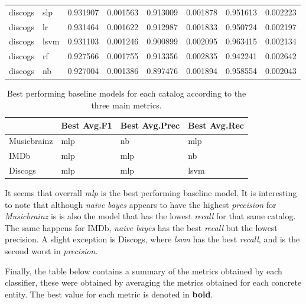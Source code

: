 \documentclass[epsfig,a4paper,11pt,titlepage,twoside,openany]{book}
\begin{document}
\begin{longtable}{|l|l|l|l|l|l|l|l|}
discogs     & slp   & 0.931907 & 0.001563   & 0.913009 & 0.001878     & 0.951613 & 0.002223    \\
discogs     & lr    & 0.931464 & 0.001622   & 0.912987 & 0.001833     & 0.950724 & 0.002197    \\
discogs     & lsvm  & 0.931103 & 0.001246   & 0.900899 & 0.002095     & 0.963415 & 0.002134    \\
discogs     & rf    & 0.927566 & 0.001755   & 0.913356 & 0.002835     & 0.942241 & 0.002642    \\
discogs     & nb    & 0.927004 & 0.001386   & 0.897476 & 0.001894     & 0.958554 & 0.002043    \\ \hline
\end{longtable}



\begin{table}[H]
\centering
\begin{tabular}{l|l|l|l}
                                  & Best Avg.F1 & Best Avg.Prec & Best Avg.Rec \\ \hline
\multicolumn{1}{l|}{Musicbrainz} & mlp    & nb       & mlp     \\ \hline
\multicolumn{1}{l|}{IMDb}        & mlp    & mlp      & nb      \\ \hline
\multicolumn{1}{l|}{Discogs}     & mlp    & mlp      & lsvm    \\ 
\end{tabular}
\caption{Best performing baseline models for each catalog according to the three main metrics.}
\label{tab:best-model-per-metric-average}
\end{table}

It seems that overrall \textit{mlp} is the best performing baseline model. It is interesting to note that although \textit{naive bayes} appears to have the highest \textit{precision} for \textit{Musicbrainz} is is also the model that has the lowest \textit{recall} for that same catalog. The same happens for IMDb, \textit{naive bayes} has the best \textit{recall} but the lowest precision. A slight exception is Discogs, where \textit{lsvm} has the best \textit{recall}, and is the second worst in \textit{precision}.

Finally, the table below contains a summary of the metrics obtained by each classifier, these were obtained by averaging the metrics obtained for each concrete entity. The best value for each metric is denoted in \textbf{bold}.
\end{document}
